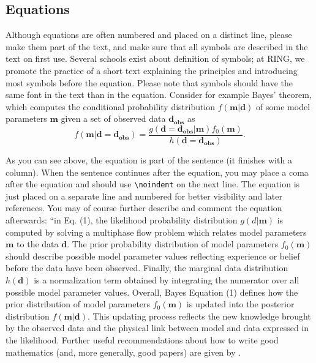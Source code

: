 \documentclass[final]{ring}
\begin{document}
\subsection{Equations}
Although equations are often numbered and placed on a distinct line, please make them part of the text, and make sure that all symbols are described in the text on first use. Several schools exist about definition of symbols; at RING, we promote the practice of a short text explaining the principles and introducing most symbols before the equation. Please note that symbols should have the same font in the text than in the equation. Consider for example Bayes’ theorem, which computes the conditional probability distribution $f(\mathbf{m}|\mathbf{d})$ of some model parameters $\mathbf{m}$ given a set of observed data $\mathbf{d_{obs}}$ as
\begin{equation}
f(\mathbf{m}| \mathbf{d} = \mathbf{d_{obs}} )=
    \frac{g( \mathbf{d} = \mathbf{d_{obs}} |\mathbf{m}) f_0(\mathbf{m})} 
    {h( \mathbf{d} = \mathbf{d_{obs}} )}.
\label{eq:Bayes}
\end{equation}

As you can see above, the equation is part of the sentence (it finishes with a column). When the sentence continues after the equation, you may place a coma after the equation and should use \verb|\noindent| on the next line. The equation is just placed on a separate line and numbered for better visibility and later references. You may of course further describe and comment the equation afterwards: “in Eq. (1), the likelihood probability distribution $g(d|\mathbf{m})$ is computed by solving a multiphase flow problem which relates model parameters $\mathbf{m}$ to the data $\mathbf{d}$. The prior probability distribution of model parameters $f_0 (\mathbf{m})$ should describe possible model parameter values reflecting experience or belief before the data have been observed. Finally, the marginal data distribution $h(\mathbf{d})$ is a normalization term obtained by integrating the numerator over all possible model parameter values. Overall, Bayes Equation (1) defines how the prior distribution of model parameters $f_0 (\mathbf{m})$ is updated into the posterior distribution $f(\mathbf{m}|\mathbf{d})$. This updating process reflects the new knowledge brought by the observed data and the physical link between model and data expressed in the likelihood. Further useful recommendations about how to write good mathematics (and, more generally, good papers) are given by \citet{Lee2010}.
\end{document}

